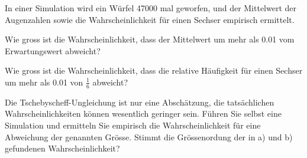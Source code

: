 In einer Simulation wird ein Würfel 47000 mal geworfen, und der Mittelwert
der Augenzahlen sowie die Wahrscheinlichkeit für einen Sechser empirisch
ermittelt.

\begin{teilaufgaben}
\item Wie gross ist die Wahrscheinlichkeit, dass der Mittelwert um mehr
als 0.01 vom Erwartungswert abweicht?
\item Wie gross ist die Wahrscheinlichkeit, dass die relative Häufigkeit
für einen Sechser um mehr als 0.01 von $\frac16$ abweicht?
\item Die Tschebyscheff-Ungleichung ist nur eine Abschätzung, die
tatsächlichen Wahrscheinlichkeiten können wesentlich geringer sein.
Führen Sie selbst eine Simulation und ermitteln Sie empirisch die
Wahrscheinlichkeit für eine Abweichung der genannten Grösse. 
Stimmt die Grössenordung der in a) und b) gefundenen Wahrscheinlichkeit?
\end{teilaufgaben}


